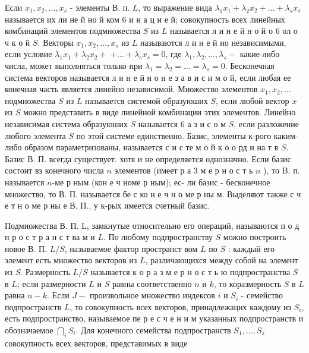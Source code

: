 \documentclass[10pt]{article}
\begin{document}
Если $x_{1}, x_{2}, \ldots, x_{s}$ - элементы В. п. $L$, то выражение вида $\lambda_{1} x_{1}+\lambda_{2} x_{2}+\ldots+\lambda_{s} x_{s}$ называется их ли не й но й ком 6 и н а ц и е й; совокупность всех линейных комбинаций элементов подмножества $S$ из $L$ называется л и н е й н о й о 6 ол о ч к о й $S$. Векторы $x_{1}, x_{2}, \ldots, x_{s}$ из $L$ называются л и н е й но независимыми, если условие $\lambda_{1} x_{1}+\lambda_{2} x_{2}+$ $+\ldots+\lambda_{s} x_{s}=0$, где $\lambda_{1}, \lambda_{2}, \ldots, \lambda_{s}-$ какие-либо числа, может выполняться только при $\lambda_{1}=\lambda_{2}=\ldots=\lambda_{s}=0$. Бесконечная система векторов называется л и н е й н о н е з а в и с и м о й, если любая ее конечная часть является линейно независимой. Множество элементов $x_{1}, x_{2}, \ldots$ подмножества $S$ из $L$ называется системой образуюших $S$, если любой вектор $x$ из $S$ можно представить в виде линейной комбинации этих элементов. Линейно независимая система образуюших $S$ называется 6 а з и с о м $S$, если разложение любого элемента $S$ по этой системе единственно. Базис, элементы к-рого каким-либо образом параметризованы, называется с и с те м о й к о о рд и на т в $S$. Базис В. П. всегда существует. хотя и не определяется однозначно. Если базис состоит вз конечного числа $n$ элементов (имеет р а 3 м е р н о с т ь $n$ ), то B. п. называется $n$-ме р ным (кон е ч номе р ным); ес- ли базис - бесконечное множество, то В. П. называется бе с ко н е ч н о ме р ны м. Выделяют также с ч е т н о ме р ны е В. П., у к-рых имеется счетный базис.



Подмножества В. П. L, замкнутые относительно его операций, называются п о д п р о с т р а н с т ва м и $L$. По любому подпространству $S$ можно построить новое В. П. $L / S$, называемое фактор пространст вом $L$ по $S$ : каждый его элемент есть множество векторов из $L$, различающихся между собой на элемент из $S$. Размерность $L / S$ называется к о р а з м е р н о с т ь ю подпространства $S$ в $L$; если размерности $L$ и $S$ равны соответственно $n$ и $k$, то коразмерность $S$ в $L$ равна $n-k$. Если $J-$ произвольное множество индексов $i$ и $S_{i}$ - семейство подпространств $L$, то совокупность всех векторов, принадлежацих каждому из $S_{i}$, есть подпространство, называемое пе р е с ч е н и м указанных подпространств и обозначаемое $\bigcap_{i} S_{i}$. Для конечного семейства подпространств $S_{1}, \ldots, S_{s}$ совокупность всех векторов, представимых в виде
\end{document}
